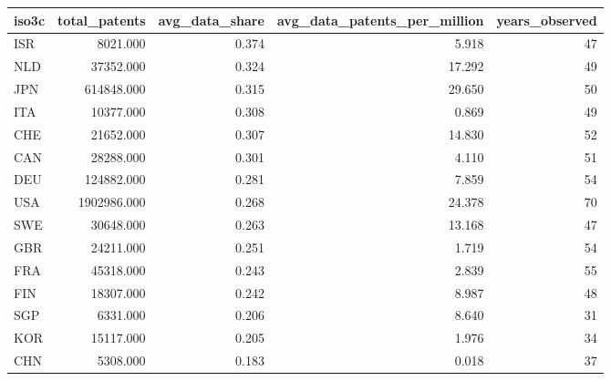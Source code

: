 \begin{tabular}{lrrrr}
\toprule
iso3c & total_patents & avg_data_share & avg_data_patents_per_million & years_observed \\
\midrule
ISR & 8021.000 & 0.374 & 5.918 & 47 \\
NLD & 37352.000 & 0.324 & 17.292 & 49 \\
JPN & 614848.000 & 0.315 & 29.650 & 50 \\
ITA & 10377.000 & 0.308 & 0.869 & 49 \\
CHE & 21652.000 & 0.307 & 14.830 & 52 \\
CAN & 28288.000 & 0.301 & 4.110 & 51 \\
DEU & 124882.000 & 0.281 & 7.859 & 54 \\
USA & 1902986.000 & 0.268 & 24.378 & 70 \\
SWE & 30648.000 & 0.263 & 13.168 & 47 \\
GBR & 24211.000 & 0.251 & 1.719 & 54 \\
FRA & 45318.000 & 0.243 & 2.839 & 55 \\
FIN & 18307.000 & 0.242 & 8.987 & 48 \\
SGP & 6331.000 & 0.206 & 8.640 & 31 \\
KOR & 15117.000 & 0.205 & 1.976 & 34 \\
CHN & 5308.000 & 0.183 & 0.018 & 37 \\
\bottomrule
\end{tabular}
